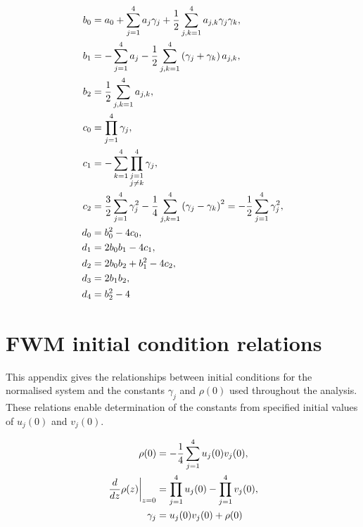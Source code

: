 \documentclass[11pt,a4paper]{article}
\numberwithin{equation}{section}
\begin{document}
\begin{align}
{b}_{0} &= {a}_{0} + \sum_{j=1}^{4} {a}_{j} {\gamma}_{j} + \frac{1}{2}\sum\limits_{j,k=1}^{4} {a}_{j,k} {\gamma}_{j} {\gamma}_{k}, \notag \\
{b}_{1} &= - \sum_{j=1}^{4} {a}_{j} - \frac{1}{2}\sum\limits_{j,k=1}^{4} \left({\gamma}_{j} + {\gamma}_{k}\right) {a}_{j,k}, \notag \\
{b}_{2} &= \frac{1}{2}\sum\limits_{j,k=1}^{4} {a}_{j,k}, \notag \\
{c}_{0} &= \prod_{j=1}^{4} {\gamma}_{j}, \notag \\
{c}_{1} &= - \sum_{k=1}^{4} \prod_{\substack{j=1 \\ j \ne k}}^{4} {\gamma}_{j}, \notag \\
{c}_{2} &= \frac{3}{2} \sum_{j=1}^{4} {\gamma}_{j}^{2} - \frac{1}{4}\sum\limits_{j,k=1}^{4} \left({\gamma}_{j} - {\gamma}_{k}\right)^{2} = - \frac{1}{2}\sum_{j=1}^{4} {\gamma}_{j}^{2}, \notag \\
{d}_{0} &= {b}_{0}^{2} - 4 {c}_{0}, \notag \\
{d}_{1} &= 2 {b}_{0} {b}_{1} - 4 {c}_{1}, \notag \\
{d}_{2} &= 2 {b}_{0} {b}_{2} + {b}_{1}^{2} - 4 {c}_{2}, \notag \\
{d}_{3} &= 2 {b}_{1} {b}_{2}, \notag \\
{d}_{4} &= {b}_{2}^{2} - 4
\end{align}


\section{FWM initial condition relations}
\label{app:init-conds}

This appendix gives the relationships between initial conditions for the normalised system and the constants $\gamma_j$ and $\rho(0)$ used throughout the analysis.
These relations enable determination of the constants from specified initial values of $u_j(0)$ and $v_j(0)$.

\begin{align}
\rho{\left(0 \right)} &= - \frac{1}{4}\sum_{j=1}^{4} u_j{\left(0 \right)} v_j{\left(0 \right)}, \notag \\
\left. \frac{d}{d z} \rho{\left(z \right)} \right|_{\substack{ z=0 }} &= \prod_{j=1}^{4} u_j(0) - \prod_{j=1}^{4} v_j(0), \notag \\
{\gamma}_{j} &= u_j{\left(0\right)} v_j{\left(0 \right)} + \rho{\left(0 \right)}
\end{align}
\end{document}
